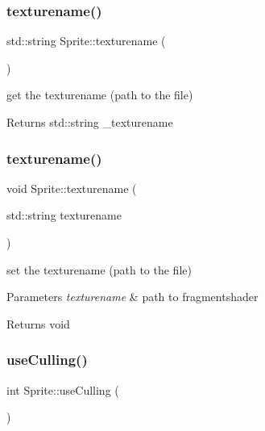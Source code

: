 \subsubsection{\texorpdfstring{texturename()}{texturename()}\hspace{0.1cm}{\footnotesize\ttfamily [1/2]}}
{\footnotesize\ttfamily std\+::string Sprite\+::texturename (\begin{DoxyParamCaption}{ }\end{DoxyParamCaption})\hspace{0.3cm}{\ttfamily [inline]}}



get the texturename (path to the file) 

\begin{DoxyReturn}{Returns}
std\+::string \+\_\+texturename 
\end{DoxyReturn}
\mbox{\label{class_sprite_a53c2368c7940851a59a4717c0909e828}} 
\subsubsection{\texorpdfstring{texturename()}{texturename()}\hspace{0.1cm}{\footnotesize\ttfamily [2/2]}}
{\footnotesize\ttfamily void Sprite\+::texturename (\begin{DoxyParamCaption}\item[{std\+::string}]{texturename }\end{DoxyParamCaption})\hspace{0.3cm}{\ttfamily [inline]}}



set the texturename (path to the file) 


\begin{DoxyParams}{Parameters}
{\em texturename} & path to fragmentshader \\
\hline
\end{DoxyParams}
\begin{DoxyReturn}{Returns}
void 
\end{DoxyReturn}
\mbox{\label{class_sprite_af008075858671c5cfad4fe679b93273b}} 
\subsubsection{\texorpdfstring{use\+Culling()}{useCulling()}\hspace{0.1cm}{\footnotesize\ttfamily [1/2]}}
{\footnotesize\ttfamily int Sprite\+::use\+Culling (\begin{DoxyParamCaption}{ }\end{DoxyParamCaption})\hspace{0.3cm}{\ttfamily [inline]}}



